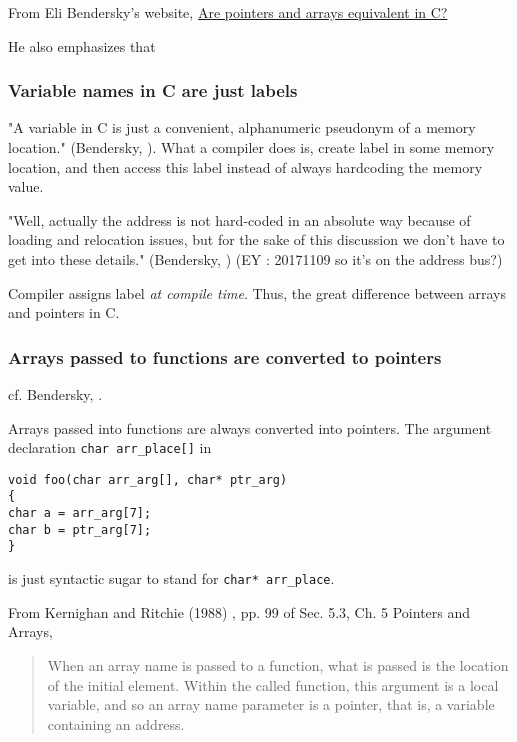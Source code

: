 \documentclass[10pt]{amsart}
\begin{document}
\begin{multicols*}{2}
From Eli Bendersky's website, \href{https://eli.thegreenplace.net/2009/10/21/are-pointers-and-arrays-equivalent-in-c}{Are pointers and arrays equivalent in C?}

He also emphasizes that 

\subsubsection{Variable names in C are just labels}  

"A variable in C is just a convenient, alphanumeric pseudonym of a memory location." (Bendersky, \cite{Bend}).  What a compiler does is, create label in some memory location, and then access this label instead of always hardcoding the memory value.   

"Well, actually the address is not hard-coded in an absolute way because of loading and relocation issues, but for the sake of this discussion we don't have to get into these details." (Bendersky, \cite{Bend}) (EY : 20171109 so it's on the address bus?)

Compiler assigns label \emph{at compile time}.  Thus, the great difference between arrays and pointers in C.  

\subsubsection{Arrays passed to functions are converted to pointers}  

cf. Bendersky, \cite{Bend}.  

Arrays passed into functions are always converted into pointers.  The argument declaration \verb|char arr_place[]| in  

\begin{lstlisting}
void foo(char arr_arg[], char* ptr_arg)
{
char a = arr_arg[7];
char b = ptr_arg[7];
}
\end{lstlisting} 

is just syntactic sugar to stand for \verb|char* arr_place|.  

From Kernighan and Ritchie (1988) \cite{KeRi1988}, pp. 99 of Sec. 5.3, Ch. 5 Pointers and Arrays,  

\begin{quotation}
	When an array name is passed to a function, what is passed is the location of the initial element.  Within the called function, this argument is a local variable, and so an array name parameter is a pointer, that is, a variable containing an address.  
\end{quotation}


\end{multicols*}
\end{document}
